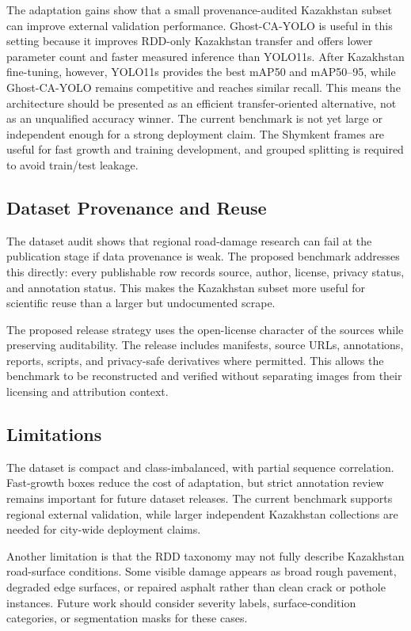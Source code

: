 \documentclass[applsci,article,submit,moreauthors]{Definitions/mdpi}
\begin{document}
The adaptation gains show that a small provenance-audited Kazakhstan subset can improve external validation performance. Ghost-CA-YOLO is useful in this setting because it improves RDD-only Kazakhstan transfer and offers lower parameter count and faster measured inference than YOLO11s. After Kazakhstan fine-tuning, however, YOLO11s provides the best mAP50 and mAP50--95, while Ghost-CA-YOLO remains competitive and reaches similar recall. This means the architecture should be presented as an efficient transfer-oriented alternative, not as an unqualified accuracy winner. The current benchmark is not yet large or independent enough for a strong deployment claim. The Shymkent frames are useful for fast growth and training development, and grouped splitting is required to avoid train/test leakage.

\subsection{Dataset Provenance and Reuse}

The dataset audit shows that regional road-damage research can fail at the publication stage if data provenance is weak. The proposed benchmark addresses this directly: every publishable row records source, author, license, privacy status, and annotation status. This makes the Kazakhstan subset more useful for scientific reuse than a larger but undocumented scrape.

The proposed release strategy uses the open-license character of the sources while preserving auditability. The release includes manifests, source URLs, annotations, reports, scripts, and privacy-safe derivatives where permitted. This allows the benchmark to be reconstructed and verified without separating images from their licensing and attribution context.

\subsection{Limitations}

The dataset is compact and class-imbalanced, with partial sequence correlation. Fast-growth boxes reduce the cost of adaptation, but strict annotation review remains important for future dataset releases. The current benchmark supports regional external validation, while larger independent Kazakhstan collections are needed for city-wide deployment claims.

Another limitation is that the RDD taxonomy may not fully describe Kazakhstan road-surface conditions. Some visible damage appears as broad rough pavement, degraded edge surfaces, or repaired asphalt rather than clean crack or pothole instances. Future work should consider severity labels, surface-condition categories, or segmentation masks for these cases.
\end{document}
